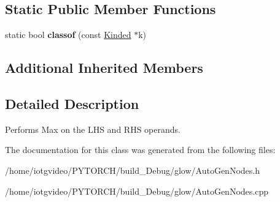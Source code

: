 \subsection*{Static Public Member Functions}
\begin{DoxyCompactItemize}
\item 
\mbox{\label{classglow_1_1_max_node_ab046f2c94b1a49844d8a57af2d416c3a}} 
static bool {\bfseries classof} (const \hyperlink{classglow_1_1_kinded}{Kinded} $\ast$k)
\end{DoxyCompactItemize}
\subsection*{Additional Inherited Members}


\subsection{Detailed Description}
Performs Max on the L\+HS and R\+HS operands. 

The documentation for this class was generated from the following files\+:\begin{DoxyCompactItemize}
\item 
/home/iotgvideo/\+P\+Y\+T\+O\+R\+C\+H/build\+\_\+\+Debug/glow/Auto\+Gen\+Nodes.\+h\item 
/home/iotgvideo/\+P\+Y\+T\+O\+R\+C\+H/build\+\_\+\+Debug/glow/Auto\+Gen\+Nodes.\+cpp\end{DoxyCompactItemize}
